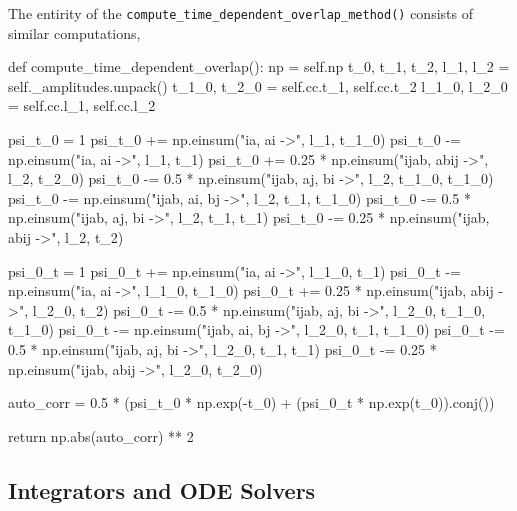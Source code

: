     The entirity of the \lstinline{compute_time_dependent_overlap_method()} consists of
    similar computations,
    \begin{python}
    def compute_time_dependent_overlap():
        np = self.np
        t_0, t_1, t_2, l_1, l_2 = self._amplitudes.unpack()
        t_1_0, t_2_0 = self.cc.t_1, self.cc.t_2 
        l_1_0, l_2_0 = self.cc.l_1, self.cc.l_2

        psi_t_0 = 1
        psi_t_0 += np.einsum("ia, ai ->", l_1, t_1_0)
        psi_t_0 -= np.einsum("ia, ai ->", l_1, t_1)
        psi_t_0 += 0.25 * np.einsum("ijab, abij ->", l_2, t_2_0)
        psi_t_0 -= 0.5 * np.einsum("ijab, aj, bi ->", l_2, t_1_0, t_1_0)
        psi_t_0 -= np.einsum("ijab, ai, bj ->", l_2, t_1, t_1_0)
        psi_t_0 -= 0.5 * np.einsum("ijab, aj, bi ->", l_2, t_1, t_1)
        psi_t_0 -= 0.25 * np.einsum("ijab, abij ->", l_2, t_2)
    
        psi_0_t = 1
        psi_0_t += np.einsum("ia, ai ->", l_1_0, t_1)
        psi_0_t -= np.einsum("ia, ai ->", l_1_0, t_1_0)
        psi_0_t += 0.25 * np.einsum("ijab, abij ->", l_2_0, t_2)
        psi_0_t -= 0.5 * np.einsum("ijab, aj, bi ->", l_2_0, t_1_0, t_1_0)
        psi_0_t -= np.einsum("ijab, ai, bj ->", l_2_0, t_1, t_1_0)
        psi_0_t -= 0.5 * np.einsum("ijab, aj, bi ->", l_2_0, t_1, t_1)
        psi_0_t -= 0.25 * np.einsum("ijab, abij ->", l_2_0, t_2_0)
    
        auto_corr = 0.5 * (psi_t_0 * np.exp(-t_0) + (psi_0_t * np.exp(t_0)).conj())

        return np.abs(auto_corr) ** 2
    \end{python}

    

\subsection{Integrators and ODE Solvers}

    

    

    